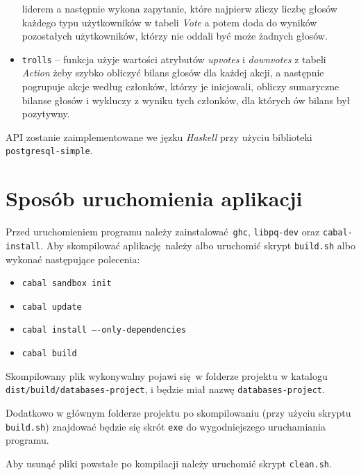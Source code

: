 \documentclass[12pt]{article}
\begin{document}
\begin{itemize}
{          liderem a następnie wykona zapytanie, które najpierw zliczy liczbę
          głosów każdego typu użytkowników w tabeli \textit{Vote} a potem
          doda do wyników pozostałych użytkowników, którzy nie oddali być może 
          żadnych głosów.}
    \item{\texttt{trolls} -- funkcja użyje wartości atrybutów \textit{upvotes} i 
          \textit{downvotes} z tabeli \textit{Action} żeby szybko obliczyć bilans
          głosów dla każdej akcji, a następnie pogrupuje akcje według członków,
          którzy je inicjowali, obliczy sumaryczne bilanse głosów i wykluczy
          z wyniku tych członków, dla których ów bilans był pozytywny.}
\end{itemize}

API zostanie zaimplementowane we jęzku \textit{Haskell} przy użyciu biblioteki
\texttt{postgresql-simple}.


\section{Sposób uruchomienia aplikacji}

Przed uruchomieniem programu należy zainstalować \texttt{ghc}, \texttt{libpq-dev} oraz 
\texttt{cabal-install}.
Aby skompilować aplikację należy albo uruchomić skrypt \texttt{build.sh} albo
wykonać następujące polecenia:
\begin{itemize}
    \item{\texttt{cabal sandbox init}}
    \item{\texttt{cabal update}}
    \item{\texttt{cabal install ----only-dependencies}}
    \item{\texttt{cabal build}}
\end{itemize}

Skompilowany plik wykonywalny pojawi się w folderze projektu w katalogu 
\texttt{dist/build/databases-project}, i będzie miał nazwę \texttt{databases-project}.

Dodatkowo w głównym folderze projektu po skompilowaniu (przy użyciu skryptu \texttt{build.sh}) znajdować będzie się skrót
\texttt{exe} do wygodniejszego uruchamiania programu.

Aby usunąć pliki powstałe po kompilacji należy uruchomić skrypt \texttt{clean.sh}.
\end{document}
